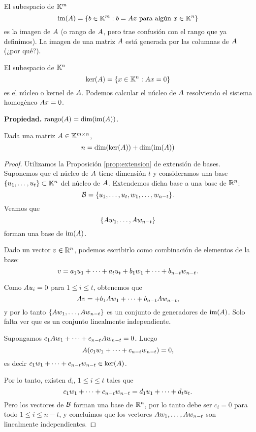 \begin{defi}
El subespacio de $\mathbb K^m$
$$
\im(A) =\{\bb \in \K^m : \bb = \Ab \xb \text{ para algún } \xb \in \K^n\}
$$
es la imagen de $\Ab$ (o rango de $\Ab$, pero trae confusión con el rango que ya definimos). La imagen de una matriz $\Ab$ está generada por las columnas de $\Ab$ (¿por qué?).

El subespacio de $\mathbb K^n$
$$
\ker(\Ab)=\{\xb \in \K^n: \Ab\xb = 0\}
$$
es el núcleo o kernel de $\Ab$. Podemos calcular el núcleo de $\Ab$ resolviendo el sistema homogéneo $\Ab\xb = 0$.
\end{defi}



\textbf{Propiedad.} $\rank(\Ab) = \dim(\im(\Ab))$.

\begin{teo} Dada una matriz $\Ab \in \K^{m \times n}$,
$$
n = \dim(\ker(\Ab)) + \dim(\im(\Ab))
$$
\end{teo}

\begin{proof}
Utilizamos la Proposición \ref{prop:extension} de extensión de bases. Suponemos que el núcleo de $\Ab$ tiene dimensión $t$ y consideramos una base $\{\ub_1, \dots, \ub_t\} \subset \K^n$ del núcleo de $\Ab$. Extendemos dicha base a una base de $\mathbb R^n$:
$$
\B = \{\ub_1, \dots, \ub_t, \wb_1, \dots, \wb_{n-t}\}.
$$
Veamos que 
$$
\{\Ab \wb_1, \dots, \Ab \wb_{n-t}\}
$$
forman una base de $\operatorname{im}(A)$.

Dado un vector $v \in \mathbb R^n$, podemos escribirlo como combinación de elementos de la base:
$$
v = a_1 \ub_1 + \dots +a_t \ub_t  + b_1 \wb_1 + \dots + b_{n-t} \wb_{n-t}.
$$

Como $\Ab \ub_i = \cero$ para $1 \le i \le t$, obtenemos que 
$$
\Ab\vb = + b_1 \Ab \wb_1 + \dots + b_{n-t} \Ab\wb_{n-t},
$$
y por lo tanto $\{\Ab \wb_1, \dots, \Ab \wb_{n-t}\}$ es un conjunto de generadores de $\operatorname{im}(A)$. Solo falta ver que es un conjunto linealmente independiente.

Supongamos $c_1 \Ab \wb_1 + \dots + c_{n-t} \Ab \wb_{n-t} = 0$. Luego 
$$
\Ab (c_1 \wb_1 + \dots + c_{n-t} \wb_{n-t}) = 0,
$$
es decir $c_1 \wb_1 + \dots + c_{n-t} \wb_{n-t} \in \ker(A)$.

Por lo tanto, existen $d_i$, $1 \le i \le t$ tales que
$$
c_1 \wb_1 + \dots + c_{n-t} \wb_{n-t} = d_1 \ub_1  + \dots + d_t \ub_t.
$$
Pero los vectores de $\mathcal B$ forman una base de $\mathbb R^n$, por lo tanto debe ser $c_i=0$ para todo $1 \le i \le n-t$, y concluimos que los vectores $\Ab \wb_1, \dots, \Ab \wb_{n-t}$ son linealmente independientes.
\end{proof}


